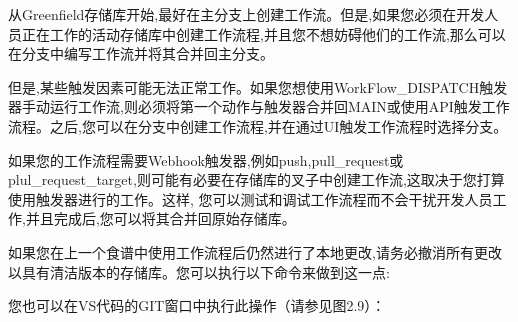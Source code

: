
从Greenfield存储库开始,最好在主分支上创建工作流。但是,如果您必须在开发人员正在工作的活动存储库中创建工作流程,并且您不想妨碍他们的工作流,那么可以在分支中编写工作流并将其合并回主分支。

但是,某些触发因素可能无法正常工作。如果您想使用WorkFlow\_DISPATCH触发器手动运行工作流,则必须将第一个动作与触发器合并回MAIN或使用API触发工作流程。之后,您可以在分支中创建工作流程,并在通过UI触发工作流程时选择分支。

如果您的工作流程需要Webhook触发器,例如push,pull\_request或plul\_request\_target,则可能有必要在存储库的叉子中创建工作流,这取决于您打算使用触发器进行的工作。这样, 您可以测试和调试工作流程而不会干扰开发人员工作,并且完成后,您可以将其合并回原始存储库。


如果您在上一个食谱中使用工作流程后仍然进行了本地更改,请务必撤消所有更改以具有清洁版本的存储库。您可以执行以下命令来做到这一点:


您也可以在VS代码的GIT窗口中执行此操作（请参见图2.9）：



